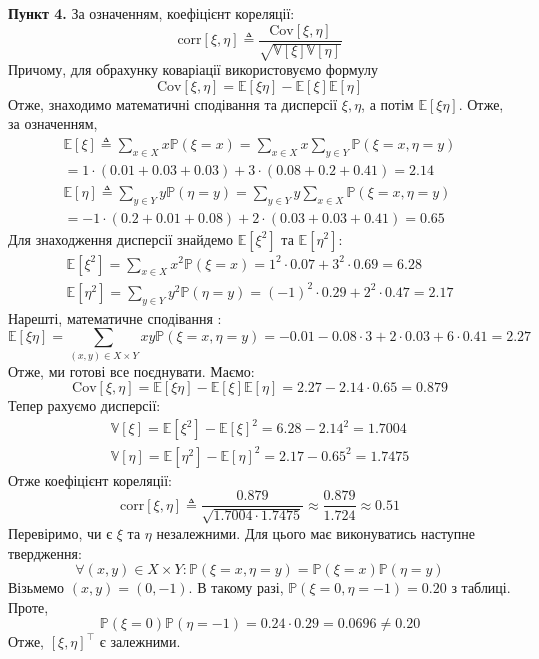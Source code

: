 \documentclass[14pt]{extarticle}
\begin{document}
\textbf{Пункт 4.} За означенням, коефіцієнт кореляції:
\[
\text{corr}[\xi,\eta] \triangleq \frac{\text{Cov}[\xi,\eta]}{\sqrt{\mathbb{V}[\xi]\mathbb{V}[\eta]}}
\]
Причому, для обрахунку коваріації використовуємо формулу
\[
\text{Cov}[\xi,\eta] = \mathbb{E}[\xi \eta] - \mathbb{E}[\xi]\mathbb{E}[\eta]
\]
Отже, знаходимо математичні сподівання та дисперсії $\xi,\eta$, а потім $\mathbb{E}[\xi \eta]$. Отже, за означенням,
\begin{align*}
\mathbb{E}[\xi] \triangleq \sum_{x \in X} x\mathbb{P}(\xi=x) = \sum_{x \in X}x \sum_{y \in Y}\mathbb{P}(\xi=x,\eta=y) \\
= 1 \cdot (0.01+0.03+0.03) + 3 \cdot (0.08+0.2+0.41) = 2.14 \\
\mathbb{E}[\eta] \triangleq \sum_{y \in Y}y\mathbb{P}(\eta=y) = \sum_{y \in Y}y\sum_{x \in X}\mathbb{P}(\xi=x,\eta=y) \\ 
= -1 \cdot (0.2+0.01+0.08) + 2 \cdot (0.03+0.03+0.41) = 0.65
\end{align*}
Для знаходження дисперсії знайдемо $\mathbb{E}[\xi^2]$ та $\mathbb{E}[\eta^2]$:
\begin{gather*}
    \mathbb{E}[\xi^2] = \sum_{x \in X}x^2\mathbb{P}(\xi=x) = 1^2 \cdot 0.07 + 3^2 \cdot 0.69 = 6.28 \\
    \mathbb{E}[\eta^2] = \sum_{y \in Y}y^2\mathbb{P}(\eta=y) = (-1)^2 \cdot 0.29 + 2^2 \cdot 0.47 = 2.17
\end{gather*}
Нарешті, математичне сподівання :
\[
\mathbb{E}[\xi\eta] = \sum_{(x,y) \in X \times Y}xy \mathbb{P}(\xi=x,\eta=y) = -0.01 - 0.08 \cdot 3 + 2 \cdot 0.03 + 6 \cdot 0.41 = 2.27
\]
Отже, ми готові все поєднувати. Маємо:
\[
\text{Cov}[\xi,\eta] = \mathbb{E}[\xi\eta] - \mathbb{E}[\xi]\mathbb{E}[\eta] = 2.27 - 2.14 \cdot 0.65 = 0.879
\]
Тепер рахуємо дисперсії:
\begin{gather*}
    \mathbb{V}[\xi] = \mathbb{E}[\xi^2] - \mathbb{E}[\xi]^2 = 6.28 - 2.14^2 = 1.7004 \\
    \mathbb{V}[\eta] = \mathbb{E}[\eta^2] - \mathbb{E}[\eta]^2 = 2.17 - 0.65^2 = 1.7475
\end{gather*}
Отже коефіцієнт кореляції:
\[
\text{corr}[\xi,\eta] \triangleq \frac{0.879}{\sqrt{1.7004 \cdot 1.7475}} \approx \frac{0.879}{1.724} \approx 0.51
\]
Перевіримо, чи є $\xi$ та $\eta$ незалежними. Для цього має виконуватись наступне твердження:
\[
\forall (x,y) \in X \times Y: \mathbb{P}(\xi=x,\eta=y) = \mathbb{P}(\xi=x)\mathbb{P}(\eta=y)
\]
Візьмемо $(x,y)=(0,-1)$. В такому разі, $\mathbb{P}(\xi=0,\eta=-1)=0.20$ з таблиці. Проте, 
\[
\mathbb{P}(\xi=0)\mathbb{P}(\eta=-1) = 0.24 \cdot 0.29 = 0.0696 \neq 0.20
\]
Отже, $[\xi,\eta]^{\top}$ є залежними. 
\end{document}

